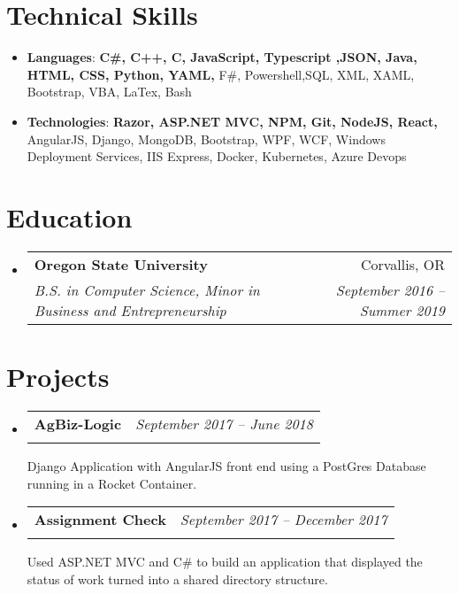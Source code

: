 \documentclass[letterpaper,11pt]{article}
\makeatletter
\newcommand{\resumeSubheading}[4]{
  \vspace{-1pt}\item
    \begin{tabular*}{0.97\textwidth}{l@{\extracolsep{\fill}}r}
      \textbf{\Large#1} & #2 \\
      \textit{\small#3} & \textit{\small #4} \\
    \end{tabular*}\vspace{-5pt}
}
\newcommand{\resumeSubHeadingListStart}{\begin{itemize}[label={},leftmargin=*]}
\newcommand{\resumeSubHeadingListEnd}{\end{itemize}}
\makeatother
\begin{document}
  
\section{Technical Skills}
  \resumeSubHeadingListStart
    \item{
     \textbf{Languages}{: \textbf{C\#, C++, C, JavaScript, Typescript ,JSON, Java, HTML, CSS, Python, YAML,} F\#, Powershell,SQL, XML, XAML, Bootstrap, VBA, LaTex, Bash}}
     \item{
      \textbf{Technologies}{: \textbf{Razor, ASP.NET MVC, NPM, Git, NodeJS, React,} AngularJS, Django, MongoDB, Bootstrap, WPF, WCF, Windows Deployment Services, IIS Express, Docker, Kubernetes, Azure Devops}

    }
  \resumeSubHeadingListEnd

\section{Education}
  \resumeSubHeadingListStart
    \resumeSubheading
      {Oregon State University}{Corvallis, OR}
      {B.S. in Computer Science, Minor in Business and Entrepreneurship}{September 2016 -- Summer 2019}
  \resumeSubHeadingListEnd

\section{Projects}
  \resumeSubHeadingListStart
    \resumeSubheading
    {AgBiz-Logic}{\textit{September 2017 -- June 2018}}
    {}{}
        Django Application with AngularJS front end using a PostGres Database running in a Rocket Container.\newline \hfill
    
    \resumeSubheading
    {Assignment Check}{\textit{September 2017 -- December 2017}}{}{}
        Used ASP.NET MVC and C\# to build an application that displayed the status of work turned into a shared directory structure.\\

  \resumeSubHeadingListEnd
\end{document}
